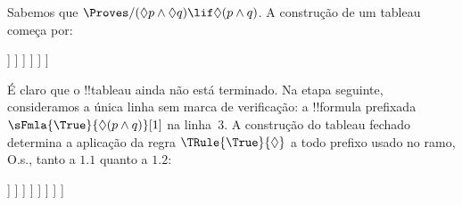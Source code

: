 \documentclass[../../../include/open-logic-section]{subfiles}
\begin{document}
{
\begin{ex}
  Sabemos que $\Proves/ (\Diamond p \land \Diamond q) \lif \Diamond(p
  \land q)$. A construção de um tableau começa por:
  \begin{oltableau}
    [\pFmla{\False}{(\Diamond p \land \Diamond q) \lif \Diamond(p \land q)}{1},
      just = \TAss, checked
      [\pFmla{\True}{\Diamond p \land \Diamond q}{1},
        just = {\TRule{\False}{\lif}[1]}, checked
        [\pFmla{\False}{\Diamond(p \land q)}{1},
          just = {\TRule{\False}{\lif}[1]}
          [\pFmla{\True}{\Diamond p}{1},
            just = {\TRule{\True}{\land}[2]}, checked
            [\pFmla{\True}{\Diamond q}{1},
              just = {\TRule{\True}{\land}[2]}, checked
              [\pFmla{\True}{p}{1.1}, 
                just = {\TRule{\True}{\Diamond}[4]}, checked
                [\pFmla{\True}{q}{1.2}, 
                  just = {\TRule{\True}{\Diamond}[5]}, checked
                ]
              ]
            ]
          ]
        ]
      ]
    ]
  \end{oltableau}
  É claro que o !!{tableau} ainda não está terminado. Na etapa seguinte,
  consideramos a única linha sem marca de verificação: a !!{formula}
  prefixada $\sFmla{\True}{\Diamond(p \land q)}[1]$ na linha~$3$. A construção
  do tableau fechado determina a aplicação da regra
  $\TRule{\True}{\Diamond}$ a todo prefixo usado no ramo, O.s.\@, tanto a
  $1.1$ quanto a $1.2$:
  \begin{oltableau}
    [\pFmla{\False}{\Diamond(p \land q) \lif (\Diamond p \land \Diamond q)}{1},
      just = \TAss, checked
      [\pFmla{\True}{\Diamond p \land \Diamond q}{1},
        just = {\TRule{\False}{\lif}[1]}, checked
        [\pFmla{\False}{\Diamond (p \land q)}{1},
          just = {\TRule{\False}{\lif}[1]}
          [\pFmla{\True}{\Diamond p}{1},
            just = {\TRule{\True}{\land}[2]}, checked
            [\pFmla{\True}{\Diamond q}{1},
              just = {\TRule{\True}{\land}[2]}, checked
              [\pFmla{\True}{p}{1.1}, 
                just = {\TRule{\True}{\Diamond}[4]}, checked
                [\pFmla{\True}{q}{1.2}, 
                  just = {\TRule{\True}{\Diamond}[5]}, checked
                  [\pFmla{\False}{p \land q}{1.1}, 
                    just = {\TRule{\False}{\Diamond}[3]}
                    [\pFmla{\False}{p \land q}{1.2}, 
                      just = {\TRule{\False}{\Diamond}[3]}
                    ]
                  ]
                ]
              ]
            ]
          ]
        ]
      ]
    ]
  \end{oltableau}

\end{ex}}
\end{document}
